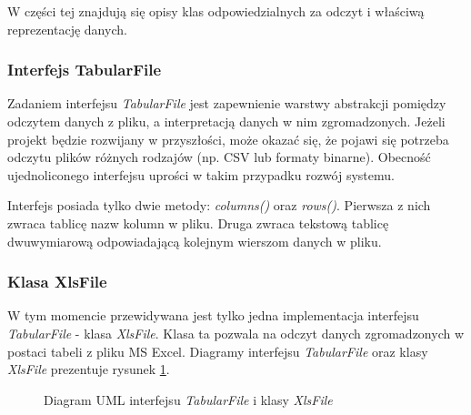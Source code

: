 \documentclass[../thesis.tex]{subfiles}
\begin{document}
W części tej znajdują się opisy klas odpowiedzialnych za odczyt i właściwą reprezentację danych.

\subsubsection{Interfejs TabularFile}

Zadaniem interfejsu \emph{TabularFile} jest zapewnienie warstwy abstrakcji pomiędzy odczytem danych z pliku, a interpretacją danych w nim zgromadzonych. Jeżeli projekt będzie rozwijany w przyszłości, może okazać się, że pojawi się potrzeba odczytu plików różnych rodzajów (np. CSV lub formaty binarne). Obecność ujednoliconego interfejsu uprości w takim przypadku rozwój systemu.

Interfejs posiada tylko dwie metody: \emph{columns()} oraz \emph{rows()}. Pierwsza z nich zwraca tablicę nazw kolumn w pliku. Druga zwraca tekstową tablicę dwuwymiarową odpowiadającą kolejnym wierszom danych w pliku.

\subsubsection{Klasa XlsFile}

W tym momencie przewidywana jest tylko jedna implementacja interfejsu \emph{TabularFile} - klasa \emph{XlsFile}. Klasa ta pozwala na odczyt danych zgromadzonych w postaci tabeli z pliku MS Excel. Diagramy interfejsu \emph{TabularFile} oraz klasy \emph{XlsFile} prezentuje rysunek \ref{proj:diagram_xls_file}.

\begin{figure}[h]
\centering
{}
\caption{Diagram UML interfejsu \emph{TabularFile} i klasy \emph{XlsFile}}
\label{proj:diagram_xls_file}
\end{figure}
\end{document}
